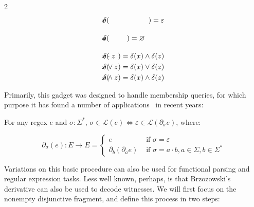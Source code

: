 \documentclass[sigplan,acmsmall,nonacm,screen]{acmart}\settopmatter{printfolios=false,printccs=false,printacmref=false}
\begin{document}
\begin{definition}[Brzozowski, 1964]
\begin{multicols}{2}
\begin{eqnarray*}
      \delta(&\hspace{-0.35cm} \varepsilon \hspace{-0.35cm}&) = \varepsilon                                      \\
      \delta(&\hspace{-0.35cm} a           \hspace{-0.35cm}&) = \varnothing\phantom{\begin{cases}\varepsilon\\\varnothing\end{cases}}\\
      \delta(&\hspace{-0.35cm} x\cdot z    \hspace{-0.35cm}&) = \delta(x) \land \delta(z)                        \\
      \delta(&\hspace{-0.35cm} x\vee  z    \hspace{-0.35cm}&) = \delta(x) \vee  \delta(z)                        \\
      \delta(&\hspace{-0.35cm} x\land z    \hspace{-0.35cm}&) = \delta(x) \land \delta(z)
    \end{eqnarray*}
  \end{multicols}
\end{definition}

Primarily, this gadget was designed to handle membership queries, for which purpose it has  found a number of applications~\cite{might2011parsing,stanford2021symbolic,varatalu2025re} in recent years:

\begin{theorem}[Recognition]\label{thm:recognition}
  For any regex \(e\) and \(\sigma: \Sigma^*\), \(\sigma \in \mathcal{L}(e) \Longleftrightarrow \varepsilon \in \mathcal{L}(\partial_\sigma e)\), where:

  \begin{equation}
    \partial_\sigma (e): E \rightarrow E = \begin{cases}e &\text{ if } \sigma = \varepsilon\\\partial_b(\partial_a e) &\text{ if } \sigma = a \cdot b, a \in \Sigma, b \in \Sigma^* \end{cases}
  \end{equation}
\end{theorem}

Variations on this basic procedure can also be used for functional parsing and regular expression tasks. Less well known, perhaps, is that Brzozowski's derivative can also be used to decode witnesses. We will first focus on the nonempty disjunctive fragment, and define this process in two steps:
\end{document}

